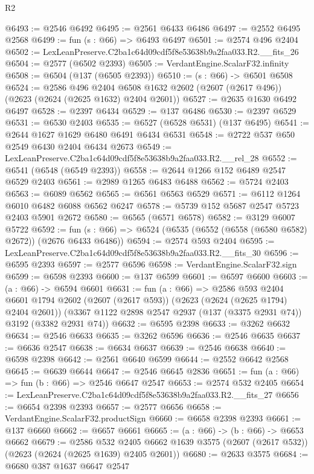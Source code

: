 \begin{lexlean}{R2}
\begin{coremodule}
@6493 := @2546 @6492
@6495 := @2561 @6433 @6486
@6497 := @2552 @6495 @2568
@6499 := fun (s : @66) => @6493 @6497
@6501 := @2574 @496 @2404
@6502 := LexLeanPreserve.C2ba1c64d09cdf5f8e53638b9a2faa033.R2.__fits_26
@6504 := @2577 (@6502 @2393)
@6505 := VerdantEngine.ScalarF32.infinity
@6508 := @6504 (@137 (@6505 @2393))
@6510 := (s : @66) -> @6501 @6508
@6524 := @2586
    @496
    @2404
    @6508
    @1632
    @2602
    (@2607 (@2617 @496))
    (@2623 (@2624 (@2625 @1632) @2404 @2601))
@6527 := @2635 @1630 @6492 @6497
@6528 := @2397 @6434
@6529 := @137 @6486
@6530 := @2397 @6529
@6531 := @6530 @2403
@6535 := @6527 (@6528 @6531) (@137 @6495)
@6541 := @2644 @1627 @1629 @6480 @6491 @6434 @6531
@6548 := @2722 @537 @650 @2549 @6430 @2404 @6434 @2673
@6549 := LexLeanPreserve.C2ba1c64d09cdf5f8e53638b9a2faa033.R2.__rel_28
@6552 := @6541 (@6548 (@6549 @2393))
@6558 := @2644 @1266 @152 @6489 @2547 @6529 @2403
@6561 := @2989 @1265 @6483 @6488
@6562 := @5724 @2403
@6563 := @6089 @6562
@6565 := @6561 @6563 @6529
@6571 := @6112 @1264 @6010 @6482 @6088 @6562 @6247
@6578 := @5739 @152 @5687 @2547 @5723 @2403 @5901 @2672
@6580 := @6565 (@6571 @6578)
@6582 := @3129 @6007 @5722
@6592 := fun (s : @66) => @6524 (@6535 (@6552 (@6558 (@6580 @6582) @2672)) (@2676 @6433 @6486))
@6594 := @2574 @593 @2404
@6595 := LexLeanPreserve.C2ba1c64d09cdf5f8e53638b9a2faa033.R2.__fits_30
@6596 := @6595 @2393
@6597 := @2577 @6596
@6598 := VerdantEngine.ScalarF32.sign
@6599 := @6598 @2393
@6600 := @137 @6599
@6601 := @6597 @6600
@6603 := (a : @66) -> @6594 @6601
@6631 := fun (a : @66) =>
  @2586
    @593
    @2404
    @6601
    @1794
    @2602
    (@2607 (@2617 @593))
    (@2623 (@2624 (@2625 @1794) @2404 @2601))
    (@3367 @1122 @2898 @2547 @2937 (@137 (@3375 @2931 @74)) @3192 (@3382 @2931 @74))
@6632 := @6595 @2398
@6633 := @3262 @6632
@6634 := @2546 @6633
@6635 := @3262 @6596
@6636 := @2546 @6635
@6637 := @6636 @2547
@6638 := @6634 @6637
@6639 := @2546 @6638
@6640 := @6598 @2398
@6642 := @2561 @6640 @6599
@6644 := @2552 @6642 @2568
@6645 := @6639 @6644
@6647 := @2546 @6645 @2836
@6651 := fun (a : @66) => fun (b : @66) => @2546 @6647 @2547
@6653 := @2574 @532 @2405
@6654 := LexLeanPreserve.C2ba1c64d09cdf5f8e53638b9a2faa033.R2.__fits_27
@6656 := @6654 @2398 @2393
@6657 := @2577 @6656
@6658 := VerdantEngine.ScalarF32.productSign
@6660 := @6658 @2398 @2393
@6661 := @137 @6660
@6662 := @6657 @6661
@6665 := (a : @66) -> (b : @66) -> @6653 @6662
@6679 := @2586
    @532
    @2405
    @6662
    @1639
    @3575
    (@2607 (@2617 @532))
    (@2623 (@2624 (@2625 @1639) @2405 @2601))
@6680 := @2633 @3575
@6684 := @6680 @387 @1637 @6647 @2547

\end{coremodule}
\end{lexlean}
